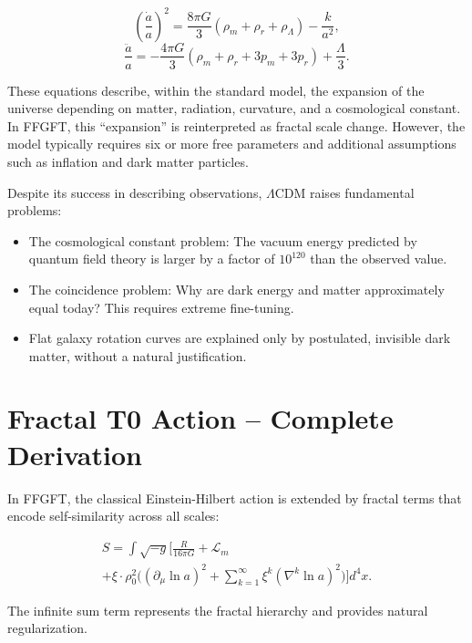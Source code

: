 	\begin{equation}
		\left( \frac{\dot{a}}{a} \right)^2 = \frac{8\pi G}{3} (\rho_m + \rho_r + \rho_\Lambda) - \frac{k}{a^2},
	\end{equation}
	\begin{equation}
		\frac{\ddot{a}}{a} = -\frac{4\pi G}{3} (\rho_m + \rho_r + 3p_m + 3p_r) + \frac{\Lambda}{3}.
	\end{equation}
	
	These equations describe, within the standard model, the expansion of the universe depending on matter, radiation, curvature, and a cosmological constant. In FFGFT, this ``expansion'' is reinterpreted as fractal scale change. However, the model typically requires six or more free parameters and additional assumptions such as inflation and dark matter particles.
	
	Despite its success in describing observations, $\Lambda$CDM raises fundamental problems:
	\begin{itemize}
		\item The cosmological constant problem: The vacuum energy predicted by quantum field theory is larger by a factor of $10^{120}$ than the observed value.
		\item The coincidence problem: Why are dark energy and matter approximately equal today? This requires extreme fine-tuning.
		\item Flat galaxy rotation curves are explained only by postulated, invisible dark matter, without a natural justification.
	\end{itemize}
	
	\section*{Fractal T0 Action – Complete Derivation}
	
	In FFGFT, the classical Einstein-Hilbert action is extended by fractal terms that encode self-similarity across all scales:
	
	\begin{equation}
		\begin{multlined}
			S = \int \sqrt{-g} \Biggl[ \frac{R}{16\pi G} + \mathcal{L}_m \\
			+ \xi \cdot \rho_0^2 \biggl( (\partial_\mu \ln a)^2 + \sum_{k=1}^\infty \xi^k (\nabla^k \ln a)^2 \biggr) \Biggr] d^4x.
		\end{multlined}
	\end{equation}
	
	The infinite sum term represents the fractal hierarchy and provides natural regularization.
	
